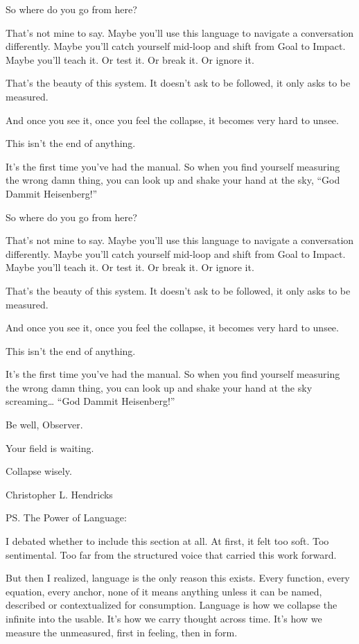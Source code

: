 \documentclass[12pt]{article}
\begin{document}
So where do you go from here?

That’s not mine to say. Maybe you’ll use this language to navigate a conversation differently. Maybe you’ll catch yourself mid-loop and shift from Goal to Impact. Maybe you’ll teach it. Or test it. Or break it. Or ignore it.

That’s the beauty of this system. It doesn’t ask to be followed, it only asks to be measured.

And once you see it, once you feel the collapse, it becomes very hard to unsee.

This isn’t the end of anything.

It’s the first time you’ve had the manual. So when you find yourself measuring the wrong damn thing, you can look up and shake your hand at the sky, “God Dammit Heisenberg!”

So where do you go from here?

That’s not mine to say. Maybe you’ll use this language to navigate a conversation differently.
Maybe you’ll catch yourself mid-loop and shift from Goal to Impact. Maybe you’ll teach it. Or test it. Or break it. Or ignore it.

That’s the beauty of this system. It doesn’t ask to be followed, it only asks to be measured.

And once you see it, once you feel the collapse, it becomes very hard to unsee.

This isn’t the end of anything.

It’s the first time you’ve had the manual.
So when you find yourself measuring the wrong damn thing, you can look up and shake your hand at the sky screaming… “God Dammit Heisenberg!”

Be well, Observer.

Your field is waiting.

Collapse wisely.

Christopher L. Hendricks

PS. The Power of Language:

I debated whether to include this section at all. At first, it felt too soft. Too sentimental. Too far from the structured voice that carried this work forward.

But then I realized, language is the only reason this exists. Every function, every equation, every anchor, none of it means anything unless it can be named, described or contextualized for consumption. Language is how we collapse the infinite into the usable. It’s how we carry thought across time. It’s how we measure the unmeasured, first in feeling, then in form.
\end{document}
